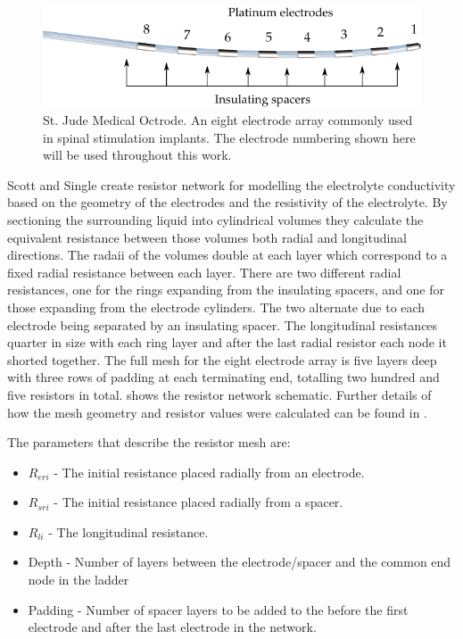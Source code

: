    \begin{figure}
      \centering
      \includegraphics{content/pt2/07-InterfaceModel/graphics/StJudeOctrodeDiagram}
      \caption{\label{fig:StJudeOctrode_Labelled}St. Jude Medical Octrode. An eight electrode array commonly used in spinal stimulation implants. The electrode numbering shown here will be used throughout this work.}
    \end{figure}

    Scott and Single create resistor network for modelling the electrolyte conductivity based on the geometry of the electrodes and the resistivity of the electrolyte.
    By sectioning the surrounding liquid into cylindrical volumes they calculate the equivalent resistance between those volumes both radial and longitudinal directions.
    The radaii of the volumes double at each layer which correspond to a fixed radial resistance between each layer.
    There are two different radial resistances, one for the rings expanding from the insulating spacers, and one for those expanding from the electrode cylinders.
    The two alternate due to each electrode being separated by an insulating spacer.
    The longitudinal resistances quarter in size with each ring layer and after the last radial resistor each node it shorted together.
    The full mesh for the eight electrode array is five layers deep with three rows of padding at each terminating end, totalling two hundred and five resistors in total.
     shows the resistor network schematic.
    Further details of how the mesh geometry and resistor values were calculated can be found in \cite{Scott2014}.

    The parameters that describe the resistor mesh are:
    \begin{itemize}
    \item $R_{eri}$ - The initial resistance placed radially from an electrode.
    \item $R_{sri}$ - The initial resistance placed radially from a spacer.
    \item $R_{li}$ - The longitudinal resistance.
    \item Depth - Number of layers between the electrode/spacer and the common end node in the ladder
    \item Padding - Number of spacer layers to be added to the before the first electrode and after the last electrode in the network.
    \end{itemize}

